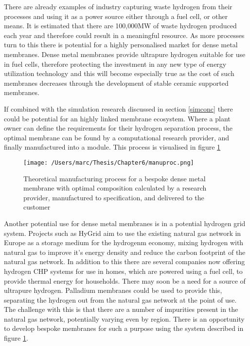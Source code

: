 There are already examples of industry capturing waste hydrogen from their processes and using it as a power source either through a fuel cell, or other means.\cite{doi:10.1177/0144598719839767} It is estimated that there are 100,000MW of waste hydrogen produced each year and therefore could result in a meaningful resource. \cite{cox} As more processes turn to this there is potential for a highly personalised market for dense metal membranes. Dense metal membranes provide ultrapure hydrogen suitable for use in fuel cells, therefore protecting the investment in any new type of energy utilization technology and this will become especially true as the cost of such membranes decreases through the development of stable ceramic supported membranes.

If combined with the simulation research discussed in section \ref{simconc} there could be potential for an highly linked membrane ecosystem. Where a plant owner can define the requirements for their hydrogen separation process, the optimal membrane can be found by a computational research provider, and finally manufactured into a module. This process is visualised in figure \ref{manuproc}

\begin{figure}
    \centering
    \texttt{[image: /Users/marc/Thesis/Chapter6/manuproc.png]}
    \caption{Theoretical manufacturing process for a bespoke dense metal membrane with optimal composition calculated by a research provider, manufactured to specification, and delivered to the customer}
    \label{manuproc}
\end{figure}

Another potential use for dense metal membranes is in a potential hydrogen grid system. Projects such as HyGrid \cite{hygrid} aim to use the existing natural gas network in Europe as a storage medium for the hydrogenm economy, mixing hydrogen with natural gas to improve it's energy density and reduce the carbon footprint of the natural gas network. In addition to this there are several companies now offering hydrogen CHP systems for use in homes, which are powered using a fuel cell, to provide thermal energy for households.\cite{giacomini} There may soon be a need for a source of ultrapure hydrogen. Palladium membranes could be used to provide this, separating the hydrogen out from the natural gas network at the point of use. The challenge with this is that there are a number of impurities present in the natural gas network, potentially varying even by region. There is an opportunity to develop bespoke membranes for such a purpose using the system described in figure \ref{manuproc}.

